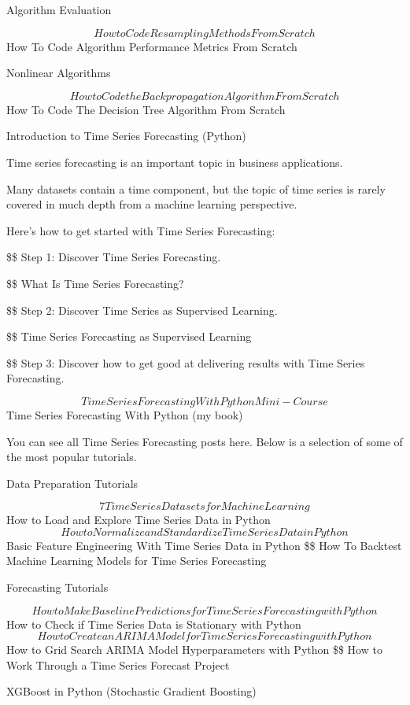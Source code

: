 \documentclass[11pt]{article}
\begin{document}
Algorithm Evaluation

$$ How to Code Resampling Methods From Scratch
$$ How To Code Algorithm Performance Metrics From Scratch

Nonlinear Algorithms

$$ How to Code the Backpropagation Algorithm From Scratch
$$ How To Code The Decision Tree Algorithm From Scratch

Introduction to Time Series Forecasting (Python)

Time series forecasting is an important topic in business applications.

Many datasets contain a time component, but the topic of time series is rarely covered in much depth from a machine learning perspective.

Here’s how to get started with Time Series Forecasting:

\$\$ Step 1: Discover Time Series Forecasting. 

\$\$ What Is Time Series Forecasting?

\$\$ Step 2: Discover Time Series as Supervised Learning. 

\$\$ Time Series Forecasting as Supervised Learning

\$\$ Step 3: Discover how to get good at delivering results with Time Series Forecasting. 

$$ Time Series Forecasting With Python Mini-Course
 $$ Time Series Forecasting With Python (my book)

You can see all Time Series Forecasting posts here. Below is a selection of some of the most popular tutorials.

Data Preparation Tutorials

$$ 7 Time Series Datasets for Machine Learning
$$ How to Load and Explore Time Series Data in Python
$$ How to Normalize and Standardize Time Series Data in Python
$$ Basic Feature Engineering With Time Series Data in Python
\$\$ How To Backtest Machine Learning Models for Time Series Forecasting

Forecasting Tutorials

$$ How to Make Baseline Predictions for Time Series Forecasting with Python
$$ How to Check if Time Series Data is Stationary with Python
$$ How to Create an ARIMA Model for Time Series Forecasting with Python
$$ How to Grid Search ARIMA Model Hyperparameters with Python
\$\$ How to Work Through a Time Series Forecast Project

XGBoost in Python (Stochastic Gradient Boosting)
\end{document}
